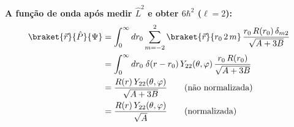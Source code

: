 \textbf{A função de onda após medir $\hat{L}^2$ e obter $6\hbar^2$ ($\ell=2$):}
\begin{align}
    \braket{\vec{r}}{\hat{P}}{\Psi} &= \int_0^\infty dr_0 \sum_{m=-2}^{2} \braket{\vec{r}}{r_0\,2\,m}\,\frac{r_0\,R(r_0)\,\delta_{m2}}{\sqrt{A+3B}} \notag \\
    &= \int_0^\infty dr_0 \; \delta(r-r_0)\,Y_{22}(\theta,\varphi)\,\frac{r_0\,R(r_0)}{\sqrt{A+3B}} \notag \\
    &= \frac{R(r)\,Y_{22}(\theta,\varphi)}{\sqrt{A+3B}} \qquad \text{(não normalizada)} \notag \\
    &= \frac{R(r)\,Y_{22}(\theta,\varphi)}{\sqrt{A}} \qquad \text{(normalizada)}
\label{eq:aula22_funcao_onda_pos_medida}
\end{align}
